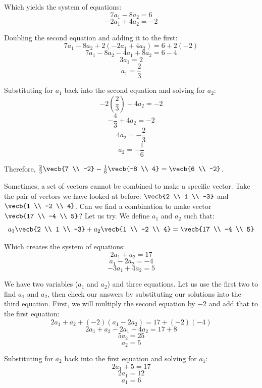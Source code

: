 \begin{Answer}[ref = combo]
\begin{enumerate}
    Which yields the system of equations:
    $$7 a_1 - 8 a_2 = 6$$
    $$-2 a_1 + 4 a_2 = -2$$

    Doubling the second equation and adding it to the first:
    $$7 a_1 - 8 a_2 + 2 \left( -2 a_1 + 4 a_2 \right) = 6 + 2 \left( -2 
    \right)$$
    $$7 a_1 - 8 a_2 - 4 a_1 + 8 a_2 = 6 - 4$$
    $$3 a_1 = 2$$
    $$a_1 = \frac{2}{3}$$

    Substituting for $a_1$ back into the second equation and solving for $a_2$:
    $$-2 \left( \frac{2}{3} \right) + 4 a_2 = -2$$
    $$-\frac{4}{3} + 4 a_2 = -2$$
    $$4 a_2 = -\frac{2}{3}$$
    $$a_2 = -\frac{1}{6}$$

    Therefore, $\frac{2}{3} \vecb{7 \\ -2} - \frac{1}{6} \vecb{-8 \\ 4} = \vecb{6 \\ -2}$.
\end{enumerate}
\end{Answer}
Sometimes, a set of vectors cannot be combined to make a specific vector. Take 
the pair of vectors we have looked at before: $\vecb{2 \\ 1 \\ -3}$ and 
$\vecb{1 \\ -2 \\ 4}$. Can we find a combination to make vector $\vecb{17 \\ -4 \\ 5}$? Let us try. We define $a_1$ and $a_2$ such that:
$$a_1 \vecb{2 \\ 1 \\ -3} + a_2 \vecb{1 \\ -2 \\ 4} = \vecb{17 \\ -4 \\ 5}$$

Which creates the system of equations:
$$2 a_1 + a_2 = 17$$
$$a_1 - 2 a_2 = -4$$
$$-3 a_1 + 4 a_2 = 5$$

We have two variables ($a_1$ and $a_2$) and three equations. Let us use the 
first two to find $a_1$ and $a_2$, then check our answers by substituting our 
solutions into the third equation. First, we will multiply the second equation 
by $-2$ and add that to the first equation:
$$2 a_1 + a_2 + \left( -2 \right) \left( a_1 - 2 a_2 \right) = 17 + \left( -2 
\right) \left( -4 \right)$$
$$2 a_1 + a_2 - 2 a_1 + 4 a_2 = 17 + 8$$
$$5 a_2 = 25$$
$$a_2 = 5$$

Substituting for $a_2$ back into the first equation and solving for $a_1$:
$$2 a_1 + 5 = 17$$
$$2 a_1 = 12$$
$$a_1 = 6$$

